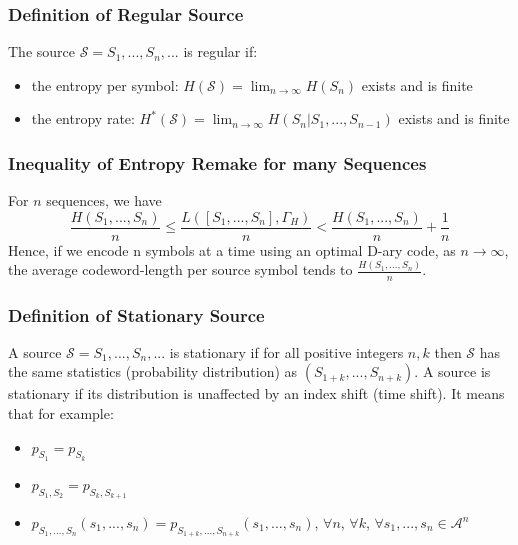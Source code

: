 \documentclass{article}
\begin{document}
\subsubsection{Definition of Regular Source} 
\begin{tcolorbox}[width=12.1cm, leftrule=3mm]
The source $ \mathcal{S} = S_1,...,S_n,... $ is regular if:
\begin{itemize}
\item the entropy per symbol: $ H(\mathcal{S}) = \lim_{n \to \infty}H(S_n) $ exists and is finite
\item the entropy rate: $ H^{*}(\mathcal{S}) = \lim_{n \to \infty}H(S_n | S_1,...,S_{n-1}) $ exists and is finite
\end{itemize}
\end{tcolorbox}

\subsubsection{Inequality of Entropy Remake for many Sequences} For $ n $ sequences, we have
\begin{equation}
\frac{H(S_1,...,S_n)}{n} \leq \frac{L([S_1,...,S_n],\Gamma_{H})}{n} < \frac{H(S_1,...,S_n)}{n} + \frac{1}{n}
\end{equation}
Hence, if we encode n symbols at a time using an optimal D-ary code, as $ n \to \infty $, the average codeword-length per source symbol tends to $ \frac{H(S_1,...,S_n)}{n} $.


\subsubsection{Definition of Stationary Source}
\begin{tcolorbox}[width=12.1cm, leftrule=3mm]
A source $ \mathcal{S} = S_1,...,S_n,... $ is stationary if for all positive integers $ n,k $ then $ \mathcal{S} $ has the same statistics (probability distribution) as $ (S_{1+k},...,S_{n+k}) $. A source is stationary if its distribution is unaffected by an index shift (time shift). It means that for example:
\begin{itemize}
\item $ p_{S_1} = p_{S_k} $
\item $ p_{S_1,S_2} = p_{S_k,S_{k+1}} $
\item $ p_{S_1,...,S_n}(s_1,...,s_n) = p_{S_{1+k},...,S_{n+k}}(s_1,...,s_n) $, $ \forall n $, $ \forall k $, $ \forall s_1,...,s_n \in \mathcal{A}^{n} $
\end{itemize}
\end{tcolorbox}
\end{document}
